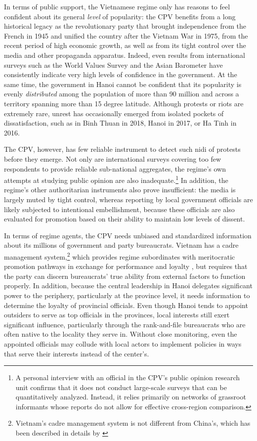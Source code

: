\documentclass[12pt]{article}
\newcommand{\1}{\mathbbm{1}}
\begin{document}
In terms of public support, the Vietnamese regime only has reasons to feel confident about its general \textit{level} of popularity: the CPV benefits from a long historical legacy as the revolutionary party that brought independence from the French in 1945 and unified the country after the Vietnam War in 1975, from the recent period of high economic growth, as well as from its tight control over the media and other propaganda apparatus. Indeed, even results from international surveys such as the World Values Survey \citeyearpar{wvs} and the Asian Barometer \citeyearpar{abs} have consistently indicate very high levels of confidence in the government. At the same time, the government in Hanoi cannot be confident that its popularity is evenly \textit{distributed} among the population of more than 90 million and across a territory spanning more than 15 degree latitude. Although protests or riots are extremely rare, unrest has occasionally emerged from isolated pockets of dissatisfaction, such as in Binh Thuan in 2018, Hanoi in 2017, or Ha Tinh in 2016. 

The CPV, however, has few reliable instrument to detect such nidi of protests before they emerge. Not only are international surveys covering too few respondents to provide reliable sub-national aggregates, the regime's own attempts at studying public opinion are also inadequate.\footnote{A personal interview with an official in the CPV's public opinion research unit confirms that it does not conduct large-scale surveys that can be quantitatively analyzed. Instead, it relies primarily on networks of grassroot informants whose reports do not allow for effective cross-region comparison.} In addition, the regime's other authoritarian instruments also prove insufficient: the media is largely muted by tight control, whereas reporting by local government officials are likely subjected to intentional embellishment, because these officials are also evaluated for promotion based on their ability to maintain low levels of dissent.

In terms of regime agents, the CPV needs unbiased and standardized information about its millions of government and party bureaucrats. Vietnam has a cadre management system,\footnote{Vietnam's cadre management system is not different from China's, which has been described in details by \citet{Manion1985}} which provides regime subordinates with meritocratic promotion pathways in exchange for performance and loyalty \citep{Svolik2012}, but requires that the party can discern bureaucrats' true ability from external factors to function properly. In addition, because the central leadership in Hanoi delegates significant power to the periphery, particularly at the province level, it needs information to determine the loyalty of provincial officials. Even though Hanoi tends to appoint outsiders to serve as top officials in the provinces, local interests still exert significant influence, particularly through the rank-and-file bureaucrats who are often native to the locality they serve in. Without close monitoring, even the appointed officials may collude with local actors to implement policies in ways that serve their interests instead of the center's. 
\end{document}
